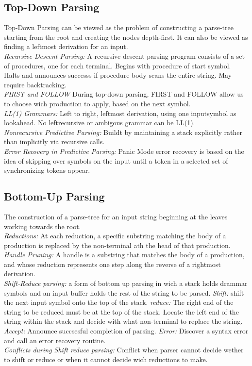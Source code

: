 \subsection{Top-Down Parsing}
Top-Down Parsing can be viewed as the problem of constructing a parse-tree starting from the root and creating the nodes depth-first. It can also be viewed as finding a leftmost derivation for an input. \\
\emph{Recursive-Descent Parsing:} A recursive-descent parsing program consists of a set of procedures, one for each terminal. Begins with procedure of start symbol. Halts and announces successs if procedure body scans the entire string. May require backtracking. \\
\emph{FIRST and FOLLOW}
During top-down parsing, FIRST and FOLLOW allow us to choose wich production to apply, based on the next symbol. \\
\emph{LL(1) Grammars:} Left to right, leftmost derivation, using one inputsymbol as lookahead. No leftrecursive or ambigous grammar can be LL(1).\\
\emph{Nonrecursive Predictive Parsing:} Buildt by maintaining a stack explicitly rather than implicitly via recursive calls. \\
\emph{Error Recovery in Predictive Parsing:} Panic Mode error recovery is based on the idea of skipping over symbols on the input until a token in a selected set of synchronizing tokens appear. 

\subsection{Bottom-Up Parsing}
The construction of a parse-tree for an input string beginning at the leaves working towards the root. \\
\emph{Reductions:} At each reduction, a specific substring matching the body of a production is replaced by the non-terminal ath the head of that production. \\
\emph{Handle Pruning:} A handle is a substring that matches the body of a production, and whose reduction represents one step along the reverse of a rightmost derivation.  \\
\emph{Shift-Reduce parsing:} a form of bottom up parsing in wich a stack holds drammar symbols and an input buffer holds the rest of the  string to be parsed. \emph{Shift:} shift the next input symbol onto the top of the stack. \emph{reduce:} The right end of the string to be reduced must be at the top of the stack. Locate the left end of the string within the stack and decide with what non-terminal to replace the string. \emph{Accept:} Announce succsesful completion of parsing. \emph{Error:} Discover a syntax error and call an error recovery routine.\\
\emph{Conflicts during Shift reduce parsing:} Conflict when parser cannot decide wether to shift or reduce or when it cannot decide wich reductions to make. 

